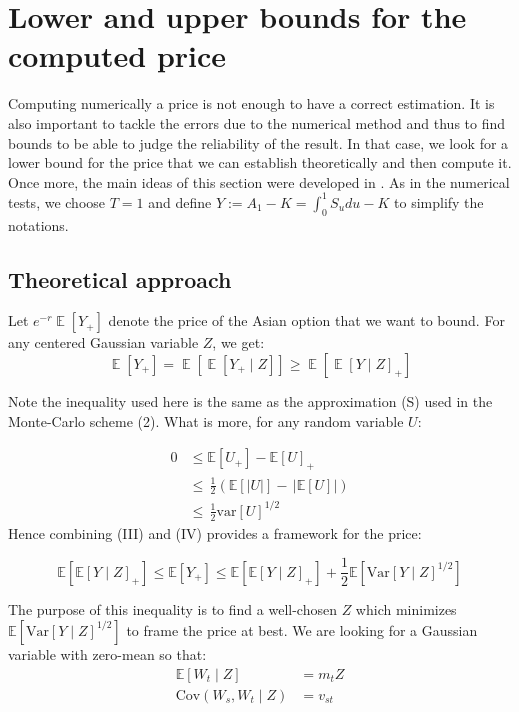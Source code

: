\documentclass{article}
\begin{document}
\section{Lower and upper bounds for the computed price}

Computing numerically a price is not enough to have a correct estimation. It is also important to tackle the errors
due to the numerical method and thus to find bounds to be able to judge the reliability of the result.
In that case, we look for a lower bound for the price that we can establish theoretically and then compute it.
Once more, the main ideas of this section were developed in \cite{Rogers}.
As in the numerical tests, we choose $T=1$ and define $Y := A_1 - K = \int_0^1 S_u du - K$ to simplify the notations.

\subsection{Theoretical approach}
Let $e^{-r} \operatorname{\mathbb{E}}[Y_{+}]$ denote the price of the Asian option that we want to bound.
For any centered Gaussian variable $Z$, we get:
\begin{equation}
\operatorname{\mathbb{E}}[Y_{+}]=\operatorname{\mathbb{E}}[\operatorname{\mathbb{E}}[Y_{+}\mid Z]]\geqslant\operatorname{\mathbb{E}}\left[\operatorname{\mathbb{E}}[Y\mid Z]_{+}\right]
\tag{III}
\end{equation}
 
Note the inequality used here is the same as the approximation (S) used in the Monte-Carlo scheme (2).
What is more, for any random variable $U$:

 \begin{equation}
    \begin{aligned}
    0 &\leqslant \mathbb{E}[U_{+}]-\mathbb{E}[U]_{+} \\ 
    &{{\leqslant\,\frac{1}{2} \left( \mathbb{E}[|U|]-\,|\mathbb{E}[U]| \right)}}\\ 
    &{{\leqslant\,\frac{1}{2}\mathrm{var}[U]^{1/2}}}
    \end{aligned}
    \tag{IV}
 \end{equation}
 Hence combining (III) and (IV) provides a framework for the price:

\[
	\mathbb{E}[\mathbb{E}[Y\mid Z]_{+}]\leq \mathbb{E}[Y_{+}]
	\leqslant \mathbb{E}[\mathbb{E}[Y\mid Z]_{+}] + \frac{1}{2}\mathbb{E}[\mathrm{Var}[Y\mid Z]^{1/2}]
\]

The purpose of this inequality is to find a well-chosen $Z$ which minimizes
$\mathbb{E}[\mathrm{Var}[Y\mid Z]^{1/2}]$ to frame the price at best.
We are looking for a Gaussian variable with zero-mean so that:
\begin{align*}
  \mathbb{E}[W_t\mid Z] &= m_{t}Z\\
  \mathrm{Cov}(W_s,W_t\mid Z) &= v_{st} 
\end{align*}
\end{document}
